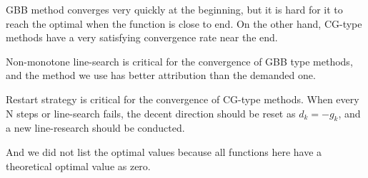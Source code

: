 \documentclass{article}
\begin{document}
GBB method converges very quickly at the beginning, but it is hard for it to reach the optimal when the function is close to end. On the other hand, CG-type methods have a very satisfying convergence rate near the end. 

Non-monotone line-search is critical for the convergence of GBB type methods, and the method we use has better attribution than the demanded one.

Restart strategy is critical for the convergence of CG-type methods. When every N steps or line-search fails, the decent direction should be reset as $d_k=-g_k$, and a new line-research should be conducted.

And we did not list the optimal values because all functions here have a theoretical optimal value as zero.
		 
\end{document}
